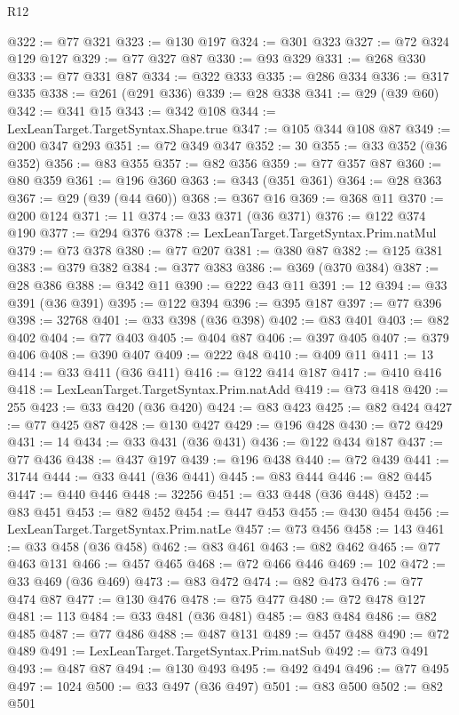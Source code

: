 \begin{lexlean}{R12}
\begin{coremodule}
@322 := @77 @321
@323 := @130 @197
@324 := @301 @323
@327 := @72 @324 @129 @127
@329 := @77 @327 @87
@330 := @93 @329
@331 := @268 @330
@333 := @77 @331 @87
@334 := @322 @333
@335 := @286 @334
@336 := @317 @335
@338 := @261 (@291 @336)
@339 := @28 @338
@341 := @29 (@39 @60)
@342 := @341 @15
@343 := @342 @108
@344 := LexLeanTarget.TargetSyntax.Shape.true
@347 := @105 @344 @108 @87
@349 := @200 @347 @293
@351 := @72 @349 @347
@352 := 30
@355 := @33 @352 (@36 @352)
@356 := @83 @355
@357 := @82 @356
@359 := @77 @357 @87
@360 := @80 @359
@361 := @196 @360
@363 := @343 (@351 @361)
@364 := @28 @363
@367 := @29 (@39 (@44 @60))
@368 := @367 @16
@369 := @368 @11
@370 := @200 @124
@371 := 11
@374 := @33 @371 (@36 @371)
@376 := @122 @374 @190
@377 := @294 @376
@378 := LexLeanTarget.TargetSyntax.Prim.natMul
@379 := @73 @378
@380 := @77 @207
@381 := @380 @87
@382 := @125 @381
@383 := @379 @382
@384 := @377 @383
@386 := @369 (@370 @384)
@387 := @28 @386
@388 := @342 @11
@390 := @222 @43 @11
@391 := 12
@394 := @33 @391 (@36 @391)
@395 := @122 @394
@396 := @395 @187
@397 := @77 @396
@398 := 32768
@401 := @33 @398 (@36 @398)
@402 := @83 @401
@403 := @82 @402
@404 := @77 @403
@405 := @404 @87
@406 := @397 @405
@407 := @379 @406
@408 := @390 @407
@409 := @222 @48
@410 := @409 @11
@411 := 13
@414 := @33 @411 (@36 @411)
@416 := @122 @414 @187
@417 := @410 @416
@418 := LexLeanTarget.TargetSyntax.Prim.natAdd
@419 := @73 @418
@420 := 255
@423 := @33 @420 (@36 @420)
@424 := @83 @423
@425 := @82 @424
@427 := @77 @425 @87
@428 := @130 @427
@429 := @196 @428
@430 := @72 @429
@431 := 14
@434 := @33 @431 (@36 @431)
@436 := @122 @434 @187
@437 := @77 @436
@438 := @437 @197
@439 := @196 @438
@440 := @72 @439
@441 := 31744
@444 := @33 @441 (@36 @441)
@445 := @83 @444
@446 := @82 @445
@447 := @440 @446
@448 := 32256
@451 := @33 @448 (@36 @448)
@452 := @83 @451
@453 := @82 @452
@454 := @447 @453
@455 := @430 @454
@456 := LexLeanTarget.TargetSyntax.Prim.natLe
@457 := @73 @456
@458 := 143
@461 := @33 @458 (@36 @458)
@462 := @83 @461
@463 := @82 @462
@465 := @77 @463 @131
@466 := @457 @465
@468 := @72 @466 @446
@469 := 102
@472 := @33 @469 (@36 @469)
@473 := @83 @472
@474 := @82 @473
@476 := @77 @474 @87
@477 := @130 @476
@478 := @75 @477
@480 := @72 @478 @127
@481 := 113
@484 := @33 @481 (@36 @481)
@485 := @83 @484
@486 := @82 @485
@487 := @77 @486
@488 := @487 @131
@489 := @457 @488
@490 := @72 @489
@491 := LexLeanTarget.TargetSyntax.Prim.natSub
@492 := @73 @491
@493 := @487 @87
@494 := @130 @493
@495 := @492 @494
@496 := @77 @495
@497 := 1024
@500 := @33 @497 (@36 @497)
@501 := @83 @500
@502 := @82 @501

\end{coremodule}
\end{lexlean}
